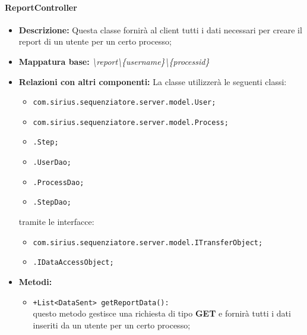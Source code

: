 \paragraph{ReportController}%
\begin{itemize}
	\item \textbf{Descrizione: } Questa classe fornirà al client tutti i dati necessari per creare il report di un utente per un certo processo;
	\item \textbf{Mappatura base: } \textit{\textbackslash report\textbackslash \{username\}\textbackslash \{processid\}}
	\item \textbf{Relazioni con altri componenti: }
	La classe utilizzerà le seguenti classi:
	\begin{itemize}
		\item \texttt{com.sirius.sequenziatore.server.model.User;}
		\item \texttt{com.sirius.sequenziatore.server.model.Process;}
		\item \texttt{\sModel .Step;}
		\item \texttt{\sModel .UserDao;}
		\item \texttt{\sModel .ProcessDao;}
		\item \texttt{\sModel .StepDao;}
		
	\end{itemize}
	tramite le interfacce:
	\begin{itemize}
		\item \texttt{com.sirius.sequenziatore.server.model.ITransferObject;}
		\item \texttt{\sModel .IDataAccessObject;}
	\end{itemize}
	\item \textbf{Metodi: }\begin{itemize}
					\item \texttt{+List<DataSent> getReportData():}\\
					questo metodo gestisce una richiesta di tipo \textbf{GET} e fornirà tutti i dati inseriti da un utente per un certo processo;
				\end{itemize}
\end{itemize}